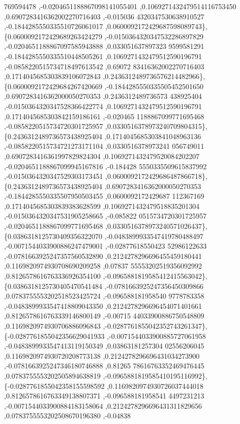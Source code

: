 \begin{DoxyCode}
      769594478 ,-0.0204651188867098141055401 ,0.1069271432479514116753450 ,0.6907283416362002270716403 ,-0.015036
      4320347530638910527 ,-0.1844285550335510726061017 ,0.0600092172429687598089743\},
\{0.0600092172429689263424279 ,-0.0150364320347532286897829 ,-0.0204651188867097585943888 ,0.033051637897323
      9599581291 ,-0.1844285550335510448505261 ,0.1069271432479512590196791 ,-0.0858220515734718497613542 ,0.69072
      83416362002270716403 ,0.1714045685303839106072843 ,0.2436312489736576214482966\},
\{0.0600092172429684267420669 ,-0.1844285550335505452501650 ,0.6907283416362000050270353 ,0.2436312489736573
      438925404 ,-0.0150364320347528366422774 ,0.1069271432479512590196791 ,0.1714045685303842159186161 ,-0.020465
      1188867099771695468 ,-0.0858220515734720301725957 ,0.0330516378973240709804315\},
\{0.2436312489736573438925404 ,0.1714045685303841048963136 ,-0.0858220515734721273171104 ,0.0330516378973241
      056749011 ,0.6907283416361997829824304 ,0.1069271432479520084202207 ,-0.0204651188867099945167816 ,-0.184428
      5550335509615837992 ,-0.0150364320347529303173451 ,0.0600092172429686487866718\},
\{0.2436312489736573438925404 ,0.6907283416362000050270353 ,-0.1844285550335507950503455 ,0.0600092172429687
      112367169 ,0.1714045685303839383628599 ,0.1069271432479518835201304 ,-0.0150364320347531905258665 ,-0.085822
      0515734720301725957 ,-0.0204651188867099771695468 ,0.0330516378973240571026437\},
\{0.0386318125730409356322070 ,-0.0483899933547419780488497 ,-0.0071544033900886247479001 ,-0.02877618550423
      52986122633 ,-0.0781663925247357560532890 ,0.2124278296696455459180441 ,0.1169820974930708690209258 ,0.07837
      55553202519356092992 ,0.8126578616763336926354100 ,-0.0965881819585412415563042\},
\{0.0386318125730405470541484 ,-0.0781663925247356450309866 ,0.0783755553202518523425724 ,-0.096588181958540
      9778783358 ,-0.0483899933547418809043350 ,0.2124278296696454071401661 ,0.8126578616763339146800149 ,-0.00715
      44033900886750548809 ,0.1169820974930706886096843 ,-0.0287761855042352743261347\},
\{-0.0287761855042356629041933 ,-0.0071544033900885727061958 ,-0.0483899933547413119150349 ,0.03863181257304
      02556206045 ,0.1169820974930720208773138 ,0.2124278296696431034273900 ,-0.0781663925247346180746888 ,0.81265
      78616763352469476445 ,0.0783755553202505894638819 ,-0.0965881819585410195116992\},
\{-0.0287761855042358155598592 ,0.1169820974930726037444018 ,0.8126578616763349138807371 ,-0.096588181958541
      4497231213 ,-0.0071544033900884183158064 ,0.2124278296696431311829656 ,0.0783755553202508670196380 ,-0.04838

\end{DoxyCode}
